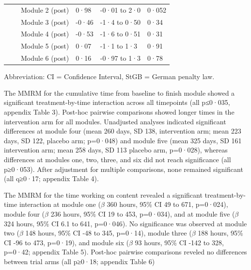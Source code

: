 \documentclass[
  super,
  preprint,
  1p,
  onecolumn]{elsarticle}
\begin{document}
\begin{table}
{\begin{tabular*}{\linewidth}{@{\extracolsep{\fill}}llll}
    Module 2 (post) & 0·98 & -0·01 to 2·0 & 0·052 \\ 
    Module 3 (post) & -0·46 & -1·4 to 0·50 & 0·34 \\ 
    Module 4 (post) & -0·53 & -1·6 to 0·51 & 0·31 \\ 
    Module 5 (post) & 0·07 & -1·1 to 1·3 & 0·91 \\ 
    Module 6 (post) & 0·16 & -0·97 to 1·3 & 0·78 \\ 
\bottomrule
\end{tabular*}
\begin{minipage}{\linewidth}
\vspace{.05em}
\parbox{\linewidth}{\raggedright {Abbreviation: CI = Confidence Interval, StGB = German penalty law.\\
}}\end{minipage}

}

\end{table}%

\newpage{}

The MMRM for the cumulative time from baseline to finish module showed a
significant treatment-by-time interaction across all timepoints (all
p≤0·035, appendix Table 3). Post-hoc pairwise comparisons showed longer
times in the intervention arm for all modules. Unadjusted analyses
indicated significant differences at module four (mean 260 days, SD 138,
intervention arm; mean 223 days, SD 122, placebo arm; p=0·048) and
module five (mean 325 days, SD 161 intervention arm; mean 258 days, SD
113 placebo arm, p=0·028), whereas differences at modules one, two,
three, and six did not reach significance (all p≥0·053). After
adjustment for multiple comparisons, none remained significant (all
q≥0·17; appendix Table 4).

The MMRM for the time working on content revealed a significant
treatment-by-time interaction at module one (\(\beta\) 360 hours, 95\%
CI 49 to 671, p=0·024), module four (\(\beta\) 236 hours, 95\% CI 19 to
453, p=0·034), and at module five (\(\beta\) 324 hours, 95\% CI 6.1 to
641, p=0·046). No significance was observed at module two (\(\beta\) 148
hours, 95\% CI -48 to 345, p=0·14), module three (\(\beta\) 188 hours,
95\% CI -96 to 473, p=0·19), and module six (\(\beta\) 93 hours, 95\% CI
-142 to 328, p=0·42; appendix Table 5). Post-hoc pairwise comparisons
reveled no differences between trial arms (all p≥0·18; appendix Table 6)

\newpage{}
\end{document}
